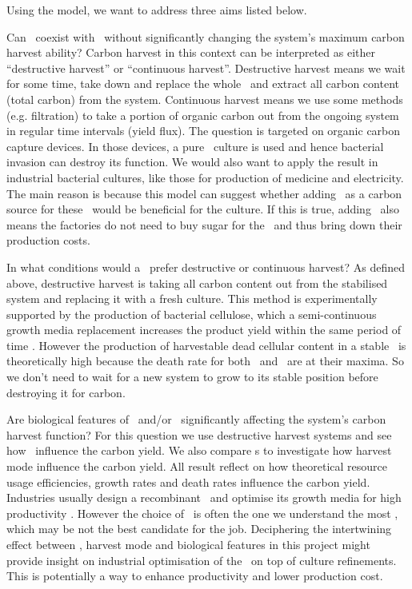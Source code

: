 \documentclass[../thesis.tex]{subfiles} %
\begin{document}
Using the model, we want to address three aims listed below.

Can \bac\ coexist with \phy\ without significantly changing the system’s maximum carbon harvest ability?  Carbon harvest in this context can be interpreted as either ``destructive harvest” or ``continuous harvest”.  Destructive harvest means we wait for some time, take down and replace the whole \pbs\ and extract all carbon content (total carbon) from the system.  Continuous harvest means we use some methods (e.g. filtration) to take a portion of organic carbon out from the ongoing system in regular time intervals (yield flux).  The question is targeted on organic carbon capture devices.  In those devices, a pure \phy\ culture is used \autocite{evanson_2019} and hence bacterial invasion can destroy its function.  We would also want to apply the result in industrial bacterial cultures, like those for production of medicine and electricity.  The main reason is because this model can suggest whether adding \phy\ as a carbon source for these \bac\ would be beneficial for the culture.  If this is true, adding \phy\ also means the factories do not need to buy sugar for the \bac\ and thus bring down their production costs.

In what conditions would a \pbs\ prefer destructive or continuous harvest?  As defined above, destructive harvest is taking all carbon content out from the stabilised system and replacing it with a fresh culture.  This method is experimentally supported by the production of bacterial cellulose, which a semi-continuous growth media replacement increases the product yield within the same period of time \autocite{aytekin2016statistical}.  However the production of harvestable dead cellular content in a stable \pbs\ is theoretically high because the death rate for both \phy\ and \bac\ are at their maxima.  So we don’t need to wait for a new system to grow to its stable position before destroying it for carbon.

Are biological features of \phy\ and/or \bac\ significantly affecting the system’s carbon harvest function?  For this question we use destructive harvest systems and see how \bac\ influence the carbon yield.  We also compare \pbs s to investigate how harvest mode influence the carbon yield.  All result reflect on how theoretical resource usage efficiencies, growth rates and death rates influence the carbon yield.  Industries usually design a recombinant \bac\ and optimise its growth media for high productivity \autocite{dash2013marine,naik2013lead,huang2012industrial,evanson_2019}.  However the choice of \bac\ is often the one we understand the most \autocite{huang2012industrial}, which may be not the best candidate for the job.  Deciphering the intertwining effect between \bac, harvest mode and biological features in this project might provide insight on industrial optimisation of the \bac\ on top of culture refinements.  This is potentially a way to enhance productivity and lower production cost.
\end{document}
